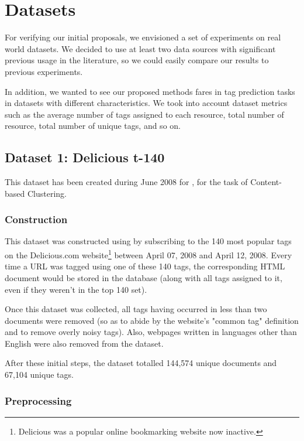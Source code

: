 \section{Datasets}\label{section:datasets}

For verifying our initial proposals, we envisioned a set of experiments on real world datasets. We decided to use at least two data sources with significant previous usage in the literature, so we could easily compare our results to previous experiments. 

In addition, we wanted to see our proposed methods fares in tag prediction tasks in datasets with different characteristics. We took into account dataset metrics such as the average number of tags assigned to each resource, total number of resource, total number of unique tags, and so on.

\subsection{Dataset 1: Delicious t-140}\label{subsec:dataset_1}

This dataset has been created during June 2008 for \cite{zubiaga_etal_2009}, for the task of Content-based Clustering.

\subsubsection{Construction}

This dataset was constructed using by subscribing to the 140 most popular tags on the Delicious.com website\footnote{Delicious was a popular online bookmarking website now inactive.} between April 07, 2008 and April 12, 2008.  Every time a URL was tagged using one of these 140 tags, the corresponding HTML document would be stored in the database (along with all tags assigned to it, even if they weren't in the top 140 set).

Once this dataset was collected, all tags having occurred in less than two documents were removed (so as to abide by the website's "common tag" definition and to remove overly noisy tags). Also, webpages written in languages other than English were also removed from the dataset.

After these initial steps, the dataset totalled 144,574 unique documents and 67,104 unique tags.

\subsubsection{Preprocessing}

